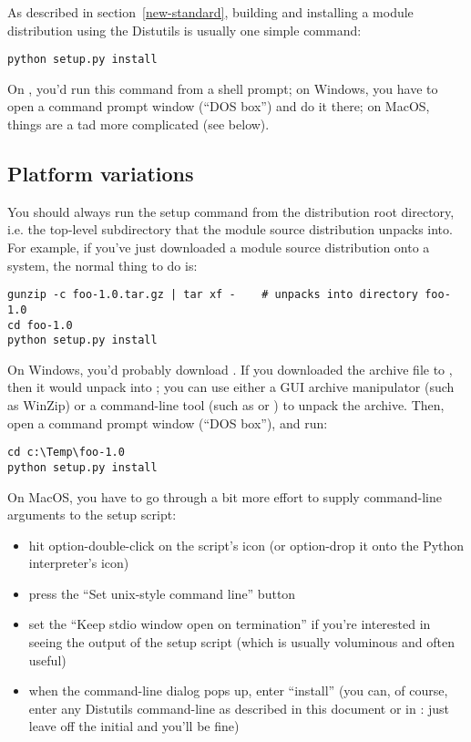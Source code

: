 \documentclass{howto}
\begin{document}
As described in section~\ref{new-standard}, building and installing
a module distribution using the Distutils is usually one simple command:
\begin{verbatim}
python setup.py install
\end{verbatim}
On \UNIX, you'd run this command from a shell prompt; on Windows, you
have to open a command prompt window (``DOS box'') and do it there; on
MacOS, things are a tad more complicated (see below).


\subsection{Platform variations}
\label{platform-variations}

You should always run the setup command from the distribution root
directory, i.e. the top-level subdirectory that the module source
distribution unpacks into.  For example, if you've just downloaded a
module source distribution  onto a
\UNIX{} system, the normal thing to do is:
\begin{verbatim}
gunzip -c foo-1.0.tar.gz | tar xf -    # unpacks into directory foo-1.0
cd foo-1.0
python setup.py install
\end{verbatim}

On Windows, you'd probably download .  If you
downloaded the archive file to , then it
would unpack into ;
you can use either a GUI archive manipulator (such as WinZip) or a
command-line tool (such as  or ) to
unpack the archive.  Then, open a command prompt window (``DOS box''),
and run:
\begin{verbatim}
cd c:\Temp\foo-1.0
python setup.py install
\end{verbatim}

On MacOS, you have to go through a bit more effort to supply
command-line arguments to the setup script:
\begin{itemize}
\item hit option-double-click on the script's icon (or option-drop it
  onto the Python interpreter's icon)
\item press the ``Set unix-style command line'' button
\item set the ``Keep stdio window open on termination'' if you're
  interested in seeing the output of the setup script (which is usually
  voluminous and often useful)
\item when the command-line dialog pops up, enter ``install'' (you
  can, of course, enter any Distutils command-line as described in this
  document or in : just leave off the initial  and
  you'll be fine)
\end{itemize}
\end{document}
